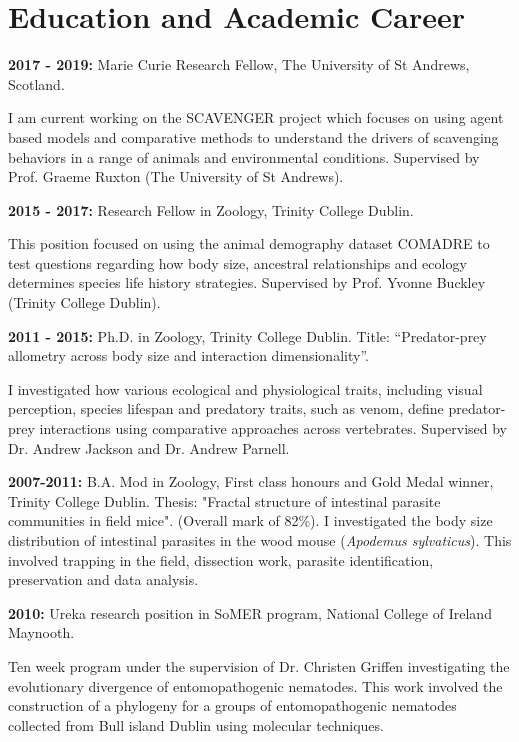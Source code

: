 \documentclass[10pt,a4paper]{article}
\begin{document}
\section{Education and Academic Career}

\raggedright	
\textbf{2017 - 2019:} Marie Curie Research Fellow, The University of St Andrews, Scotland.
 \smallskip
\par{\fontsize{10.5}{10} I am current working on the SCAVENGER project which focuses on using agent based models and comparative methods to understand the drivers of scavenging behaviors in a range of animals and environmental conditions. Supervised by Prof. Graeme Ruxton (The University of St Andrews).
\bigskip}

\raggedright	
\textbf{2015 - 2017:} Research Fellow in Zoology, Trinity College Dublin.
 \smallskip
\par{\fontsize{10.5}{10} This position focused on using the animal demography dataset COMADRE to test questions regarding how body size, ancestral relationships and ecology determines species life history strategies. Supervised by Prof. Yvonne Buckley (Trinity College Dublin).\bigskip}

\raggedright	
\textbf{2011 - 2015:} Ph.D. in Zoology, Trinity College Dublin. Title: “Predator-prey allometry across body size and interaction dimensionality”.\\ \par{\fontsize{10.5}{10} I investigated how various ecological and physiological traits, including visual perception, species lifespan and predatory traits, such as venom, define predator-prey interactions using comparative approaches across vertebrates. Supervised by Dr. Andrew Jackson and Dr. Andrew Parnell.
\bigskip}


\textbf{2007-2011:} B.A. Mod in Zoology, First class honours and Gold Medal winner, Trinity College Dublin.
Thesis: "Fractal structure of intestinal parasite communities in field mice". (Overall mark of 82\%).
I investigated the body size distribution of intestinal parasites in the wood mouse (\textit{Apodemus sylvaticus}). This involved trapping in the field, dissection work, parasite identification, preservation and data analysis.
\bigskip

\textbf{2010:} Ureka research position in SoMER program, National College of Ireland Maynooth.\\
\par{\fontsize{10.5}{10} Ten week program under the supervision of Dr. Christen Griffen investigating the evolutionary divergence of entomopathogenic nematodes. This work involved the construction of a phylogeny for a groups of entomopathogenic nematodes collected from Bull island Dublin using molecular techniques.}
\bigskip
\end{document}
